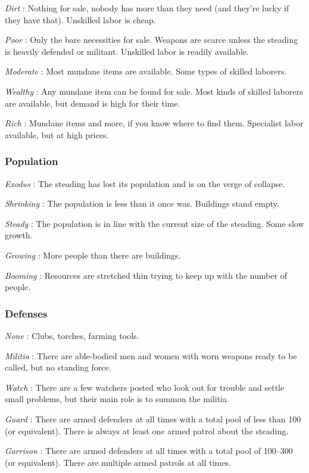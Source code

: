 \emph{Dirt}
: Nothing for sale, nobody has more than they need (and they're lucky if they have that). Unskilled labor is cheap.


\emph{Poor}
: Only the bare necessities for sale. Weapons are scarce unless the steading is heavily defended or militant. Unskilled labor is readily available.


\emph{Moderate}
: Most mundane items are available. Some types of skilled laborers.


\emph{Wealthy}
: Any mundane item can be found for sale. Most kinds of skilled laborers are available, but demand is high for their time.


\emph{Rich}
: Mundane items and more, if  you know where to find them. Specialist labor available, but at high prices.
\subsubsection{Population}


\emph{Exodus}
: The steading has lost its population and is on the verge of collapse.


\emph{Shrinking}
: The population is less than it once was. Buildings stand empty.


\emph{Steady}
: The population is in line with the current size of the steading. Some slow growth.


\emph{Growing}
: More people than there are buildings.


\emph{Booming}
: Resources are stretched thin trying to keep up with the number of people.
\subsubsection{Defenses}


\emph{None}
: Clubs, torches, farming tools.


\emph{Militia}
: There are able-bodied men and women with worn weapons ready to be called, but no standing force.


\emph{Watch}
: There are a few watchers posted who look out for trouble and settle small problems, but their main role is to summon the militia.


\emph{Guard}
: There are armed defenders at all times with a total pool of less than 100 (or equivalent). There is always at least one armed patrol about the steading.


\emph{Garrison}
: There are armed defenders at all times with a total pool of 100--300 (or equivalent). There are multiple armed patrols at all times.


